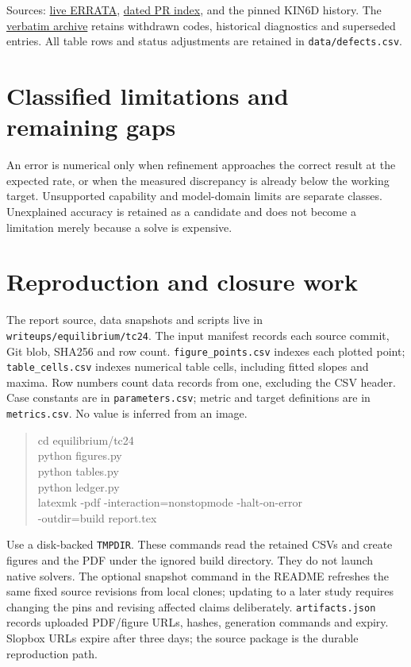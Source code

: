 \documentclass[10pt,a4paper]{article}
\newcommand{\tcroot}{https://gitlab.tugraz.at/plasma/proj/ntv/iter_tc24/-/blob/5f267d12c/}
\newcommand{\tcfile}[2]{\href{\tcroot#1}{#2}}
\newcommand{\pageheading}[1]{\clearpage\section{#1}}
\begin{document}
Sources: \tcfile{equilibrium/ERRATA.md}{live ERRATA},
\tcfile{review/UPSTREAM_PRS.md}{dated PR index}, and the pinned KIN6D history.
The \tcfile{equilibrium/ERRATA_ARCHIVE.md}{verbatim archive} retains withdrawn
codes, historical diagnostics and superseded entries. All table rows and
status adjustments are retained in \texttt{data/defects.csv}.



\pageheading{Classified limitations and remaining gaps}
An error is numerical only when refinement approaches the correct result at
the expected rate, or when the measured discrepancy is already below the
working target. Unsupported capability and model-domain limits are separate
classes. Unexplained accuracy is retained as a candidate and does not become
a limitation merely because a solve is expensive.



\pageheading{Reproduction and closure work}
The report source, data snapshots and scripts live in
\texttt{writeups/equilibrium/tc24}. The input manifest records each source
commit, Git blob, SHA256 and row count. \texttt{figure\_points.csv} indexes
each plotted point; \texttt{table\_cells.csv} indexes numerical table cells,
including fitted slopes and maxima. Row numbers count data records from one,
excluding the CSV header. Case constants are in \texttt{parameters.csv};
metric and target definitions are in \texttt{metrics.csv}. No value is inferred
from an image.

\begin{quote}\small\ttfamily
cd equilibrium/tc24\\
python figures.py\\
python tables.py\\
python ledger.py\\
latexmk -pdf -interaction=nonstopmode -halt-on-error\\
\hspace*{1em}-outdir=build report.tex
\end{quote}

Use a disk-backed \texttt{TMPDIR}. These commands read the retained CSVs and
create figures and the PDF under the ignored build directory. They do not
launch native solvers. The optional snapshot command in the README refreshes
the same fixed source revisions from local clones; updating to a later study
requires changing the pins and revising affected claims deliberately.
\texttt{artifacts.json} records uploaded PDF/figure URLs, hashes, generation
commands and expiry. Slopbox URLs expire after three days; the source package
is the durable reproduction path.
\end{document}

